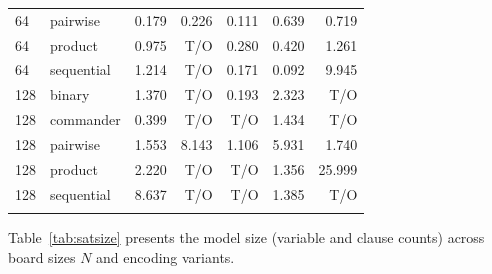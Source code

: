 \documentclass[a4paper,fleqn]{cas-sc}
\begin{document}
\begin{table}[htbp]
{\begin{tabular}{llrrrrr}
64 & pairwise & 0.179 & 0.226 & 0.111 & 0.639 & 0.719 \\
64 & product & 0.975 & T/O & 0.280 & 0.420 & 1.261 \\
64 & sequential & 1.214 & T/O & 0.171 & 0.092 & 9.945 \\
128 & binary & 1.370 & T/O & 0.193 & 2.323 & T/O \\
128 & commander & 0.399 & T/O & T/O & 1.434 & T/O \\
128 & pairwise & 1.553 & 8.143 & 1.106 & 5.931 & 1.740 \\
128 & product & 2.220 & T/O & T/O & 1.356 & 25.999 \\
128 & sequential & 8.637 & T/O & T/O & 1.385 & T/O \\
\bottomrule
\tabularnewline
\end{tabular}%
}
\end{table}

Table~\ref{tab:satsize} presents the model size (variable and clause counts) across board sizes $N$ and encoding variants.
\end{document}
